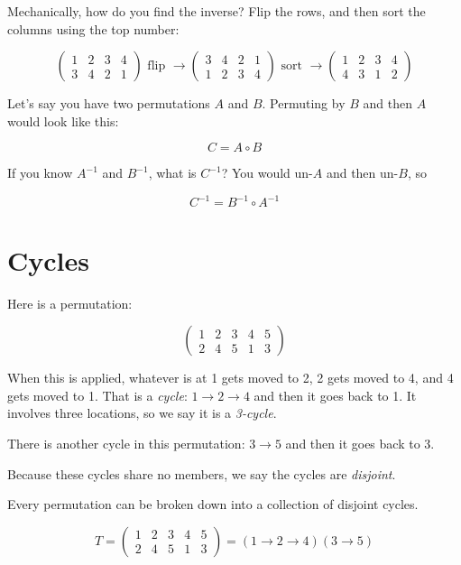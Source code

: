 Mechanically, how do you find the inverse? Flip the rows, and then sort the columns using the top number:

$$\begin{pmatrix}
  1 & 2 & 3 & 4 \\
  3 & 4 & 2 & 1
\end{pmatrix}
\text{ flip }\rightarrow
\begin{pmatrix}
  3 & 4 & 2 & 1 \\
  1 & 2 & 3 & 4
\end{pmatrix}
\text{ sort }\rightarrow
\begin{pmatrix}
  1 & 2 & 3 & 4 \\
  4 & 3 & 1 & 2
\end{pmatrix}
$$    

Let's say you have two permutations $A$ and $B$.  Permuting by $B$ and then $A$ would look like this:

$$C = A \circ B$$

If you know $A^{-1}$ and $B^{-1}$, what is $C^{-1}$?  You would un-$A$ and then un-$B$, so

$$C^{-1} = B^{-1} \circ A^{-1}$$

\section{Cycles}

Here is a permutation:

$$\begin{pmatrix}
  1 & 2 & 3 & 4 & 5 \\
  2 & 4 & 5 & 1 & 3
\end{pmatrix}$$

When this is applied, whatever is at 1 gets moved to 2, 2 gets moved
to 4, and 4 gets moved to 1.  That is a \textit{cycle}: $1 \rightarrow
2 \rightarrow 4$ and then it goes back to 1. It involves three locations, so we say
it is a \textit{3-cycle}.

There is another cycle in this permutation: $3 \rightarrow 5$ and then it goes back to 3.

Because these cycles share no members, we say the cycles are \textit{disjoint}.

Every permutation can be broken down into a collection of disjoint cycles.

$$T = \begin{pmatrix}
  1 & 2 & 3 & 4 & 5 \\
  2 & 4 & 5 & 1 & 3
\end{pmatrix} = (1 \rightarrow 2 \rightarrow 4)(3 \rightarrow 5)$$

